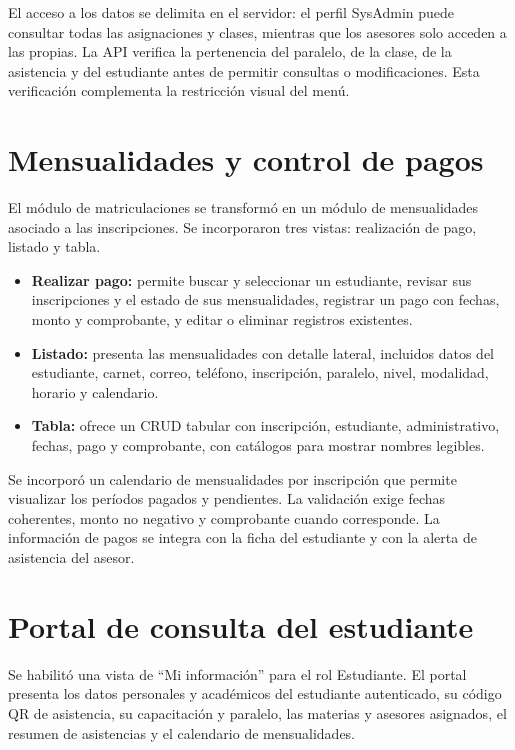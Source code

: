 \documentclass[12pt,a4paper,oneside]{report}
\begin{document}
El acceso a los datos se delimita en el servidor: el perfil SysAdmin puede consultar todas las asignaciones y clases, mientras que los asesores solo acceden a las propias. La API verifica la pertenencia del paralelo, de la clase, de la asistencia y del estudiante antes de permitir consultas o modificaciones. Esta verificación complementa la restricción visual del menú.

\section{Mensualidades y control de pagos}

El módulo de matriculaciones se transformó en un módulo de mensualidades asociado a las inscripciones. Se incorporaron tres vistas: realización de pago, listado y tabla.

\begin{itemize}[leftmargin=1.5em]
  \item \textbf{Realizar pago:} permite buscar y seleccionar un estudiante, revisar sus inscripciones y el estado de sus mensualidades, registrar un pago con fechas, monto y comprobante, y editar o eliminar registros existentes.
  \item \textbf{Listado:} presenta las mensualidades con detalle lateral, incluidos datos del estudiante, carnet, correo, teléfono, inscripción, paralelo, nivel, modalidad, horario y calendario.
  \item \textbf{Tabla:} ofrece un CRUD tabular con inscripción, estudiante, administrativo, fechas, pago y comprobante, con catálogos para mostrar nombres legibles.
\end{itemize}

Se incorporó un calendario de mensualidades por inscripción que permite visualizar los períodos pagados y pendientes. La validación exige fechas coherentes, monto no negativo y comprobante cuando corresponde. La información de pagos se integra con la ficha del estudiante y con la alerta de asistencia del asesor.

\section{Portal de consulta del estudiante}

Se habilitó una vista de ``Mi información'' para el rol Estudiante. El portal presenta los datos personales y académicos del estudiante autenticado, su código QR de asistencia, su capacitación y paralelo, las materias y asesores asignados, el resumen de asistencias y el calendario de mensualidades.
\end{document}
